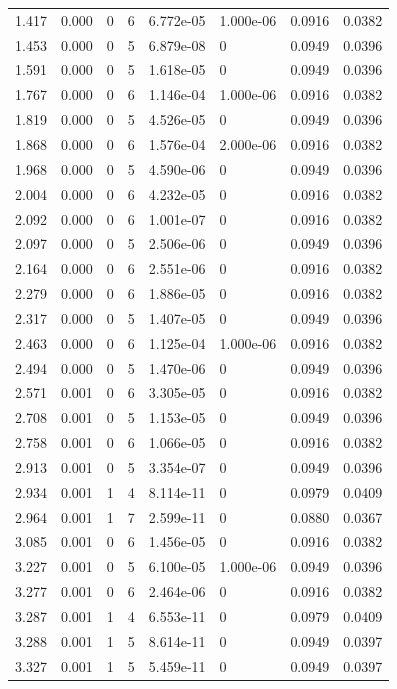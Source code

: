 \documentclass[preview]{standalone}
\begin{document}
{{\begin{tabular}{L{1.2cm}C{1.2cm} C{0.3cm}C{0.5cm} C{1.4cm}C{1.4cm} C{1.4cm}C{1.4cm}}
  1.417  &  0.000  & 0     &  6 &  6.772e-05  & 1.000e-06  & 0.0916 &  0.0382   \\ 
  1.453  &  0.000  & 0     &  5 &  6.879e-08  & 0  & 0.0949 &  0.0396   \\ 
  1.591  &  0.000  & 0     &  5 &  1.618e-05  & 0  & 0.0949 &  0.0396   \\ 
  1.767  &  0.000  & 0     &  6 &  1.146e-04  & 1.000e-06  & 0.0916 &  0.0382   \\ 
  1.819  &  0.000  & 0     &  5 &  4.526e-05  & 0  & 0.0949 &  0.0396   \\ 
  1.868  &  0.000  & 0     &  6 &  1.576e-04  & 2.000e-06  & 0.0916 &  0.0382   \\ 
  1.968  &  0.000  & 0     &  5 &  4.590e-06  & 0  & 0.0949 &  0.0396   \\ 
  2.004  &  0.000  & 0     &  6 &  4.232e-05  & 0  & 0.0916 &  0.0382   \\ 
  2.092  &  0.000  & 0     &  6 &  1.001e-07  & 0  & 0.0916 &  0.0382   \\ 
  2.097  &  0.000  & 0     &  5 &  2.506e-06  & 0  & 0.0949 &  0.0396   \\ 
  2.164  &  0.000  & 0     &  6 &  2.551e-06  & 0  & 0.0916 &  0.0382   \\ 
  2.279  &  0.000  & 0     &  6 &  1.886e-05  & 0  & 0.0916 &  0.0382   \\ 
  2.317  &  0.000  & 0     &  5 &  1.407e-05  & 0  & 0.0949 &  0.0396   \\ 
  2.463  &  0.000  & 0     &  6 &  1.125e-04  & 1.000e-06  & 0.0916 &  0.0382   \\ 
  2.494  &  0.000  & 0     &  5 &  1.470e-06  & 0  & 0.0949 &  0.0396   \\ 
  2.571  &  0.001  & 0     &  6 &  3.305e-05  & 0  & 0.0916 &  0.0382   \\ 
  2.708  &  0.001  & 0     &  5 &  1.153e-05  & 0  & 0.0949 &  0.0396   \\ 
  2.758  &  0.001  & 0     &  6 &  1.066e-05  & 0  & 0.0916 &  0.0382   \\ 
  2.913  &  0.001  & 0     &  5 &  3.354e-07  & 0  & 0.0949 &  0.0396   \\ 
  2.934  &  0.001  & 1     &  4 &  8.114e-11  & 0  & 0.0979 &  0.0409   \\ 
  2.964  &  0.001  & 1     &  7 &  2.599e-11  & 0  & 0.0880 &  0.0367   \\ 
  3.085  &  0.001  & 0     &  6 &  1.456e-05  & 0  & 0.0916 &  0.0382   \\ 
  3.227  &  0.001  & 0     &  5 &  6.100e-05  & 1.000e-06  & 0.0949 &  0.0396   \\ 
  3.277  &  0.001  & 0     &  6 &  2.464e-06  & 0  & 0.0916 &  0.0382   \\ 
  3.287  &  0.001  & 1     &  4 &  6.553e-11  & 0  & 0.0979 &  0.0409   \\ 
  3.288  &  0.001  & 1     &  5 &  8.614e-11  & 0  & 0.0949 &  0.0397   \\ 
  3.327  &  0.001  & 1     &  5 &  5.459e-11  & 0  & 0.0949 &  0.0397   \\ 
\hline 
\end{tabular} 

}}
\end{document}
